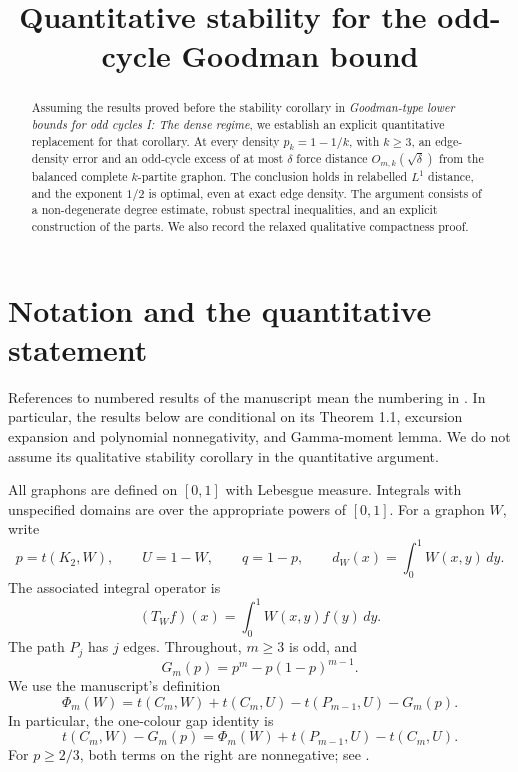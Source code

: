 \documentclass[11pt]{article}
\title{Quantitative stability for the odd-cycle Goodman bound}
\author{}
\date{}
\theoremstyle{remark}
\begin{document}
\maketitle

\begin{abstract}
Assuming the results proved before the stability corollary in
\emph{Goodman-type lower bounds for odd cycles I: The dense regime},
we establish an explicit quantitative replacement for that corollary.
At every density $p_k=1-1/k$, with $k\geq3$, an edge-density error and
an odd-cycle excess of at most $\delta$ force distance
$O_{m,k}(\sqrt{\delta})$ from the balanced complete $k$-partite graphon.
The conclusion holds in relabelled $L^1$ distance, and the exponent
$1/2$ is optimal, even at exact edge density.
The argument consists of a non-degenerate degree estimate, robust
spectral inequalities, and an explicit construction of the parts.
We also record the relaxed qualitative compactness proof.
\end{abstract}

\section{Notation and the quantitative statement}

References to numbered results of the manuscript mean the numbering in
\cite{dense}. In particular, the results below are conditional on its
Theorem 1.1, excursion expansion and polynomial nonnegativity, and
Gamma-moment lemma. We do not assume its qualitative stability corollary
in the quantitative argument.

All graphons are defined on $[0,1]$ with Lebesgue measure. Integrals with
unspecified domains are over the appropriate powers of $[0,1]$.
For a graphon $W$, write
\[
 p=t(K_2,W),\qquad U=1-W,\qquad q=1-p,
 \qquad d_W(x)=\int_0^1W(x,y)\,dy.
\]
The associated integral operator is
\[
 (T_Wf)(x)=\int_0^1W(x,y)f(y)\,dy.
\]
The path $P_j$ has $j$ edges. Throughout, $m\geq3$ is odd, and
\[
 G_m(p)=p^m-p(1-p)^{m-1}.
\]
We use the manuscript's definition
\begin{equation}\label{eq:Phi-definition}
 \Phi_m(W)=t(C_m,W)+t(C_m,U)-t(P_{m-1},U)-G_m(p).
\end{equation}
In particular, the one-colour gap identity is
\begin{equation}\label{eq:gap-decomposition}
 t(C_m,W)-G_m(p)
 =\Phi_m(W)+t(P_{m-1},U)-t(C_m,U).
\end{equation}
For $p\geq2/3$, both terms on the right are nonnegative; see
\cite[Eq.~(6.3)]{dense}.
\end{document}
